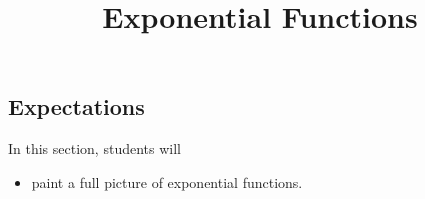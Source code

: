 \documentclass{ximera}
\title{Exponential Functions}
\begin{document}
\begin{abstract}
\end{abstract}
\maketitle



















\subsection{Expectations}


\begin{sectionOutcomes}
In this section, students will 

\begin{itemize}
\item paint a full picture of exponential functions.
\end{itemize}
\end{sectionOutcomes}
\end{document}
